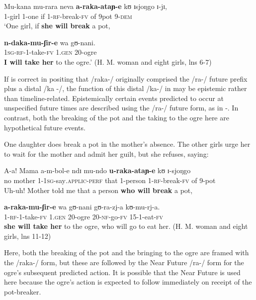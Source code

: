 \documentclass[output=paper]{langsci/langscibook}
\begin{document}
\ea\label{ex:sarvasy:14}
\gll Mu-kana   mu-rara   neva   \textbf{a-raka-ataɲ-e}   kʊ     ɪsjoŋgo   ɪ{}-jɪ,  \\
1-girl    1-one    if  1-\textsc{rf}{}-break-\textsc{fv}  of  9pot   9-\textsc{dem} \\
\glt ‘One girl, if \textbf{she will break} a pot,

\gll \textbf{n-daka-mu-ʃir-e}   wa   gʊ-nani. \\
\textsc{1sg-rf-}1-take-\textsc{fv}  1.\textsc{gen}  20-ogre \\
\glt \textbf{I will take her} to the ogre.’ (H. M. woman and eight girls, lns 6-7)
\z

If \citet{Botne1999} is correct in positing that /raka-/ originally comprised the /ra-/ future prefix plus a distal /ka%
%
{}-/, the function of this distal /ka-/ in  may be epistemic rather than timeline-related. Epistemically certain events predicted to occur at unspecified future times are described using the /ra-/ future form, as in -. In contrast, both the breaking of the pot and the taking to the ogre here are hypothetical future events. 

One daughter does break a pot in the mother’s absence. The other girls urge her to wait for the mother and admit her guilt, but she refuses, saying:

\ea\label{ex:sarvasy:15}
\gll A-a!  Mama    a-m-bol-e      ndɪ   mu-ndo   \textbf{u-raka-ataɲ-e}   kʊ   ɪ{}-sjoŋgo  \\
no  mother  1-1\textsc{sg}{}-say\textsc{.applic-perf}  that  1-person  1\textsc{{}-rf}{}-break-\textsc{fv}  of  9-pot\\
\glt Uh-uh! Mother told me that a person \textbf{who will break} a pot,

\gll \textbf{a-raka-mu-ʃir-e}   wa   gʊ-nani  gʊ-ra-zj-a  kʊ-mu-rj-a.\\
1\textsc{{}-rf-}1-take-\textsc{fv}    1.\textsc{gen}  20-ogre  20-\textsc{nf}{}-go-\textsc{fv}  15-1-eat-\textsc{fv} \\
\glt \textbf{she will take her} to the ogre, who will go to eat her. (H. M. woman and eight girls, lns 11-12)
\z

Here, both the breaking of the pot and the bringing to the ogre are framed with the /raka-/ form, but these are followed by the Near Future /ra-/ form for the ogre’s subsequent predicted action. It is possible that the Near Future is used here because the ogre’s action is expected to follow immediately on receipt of the pot-breaker.
\end{document}
